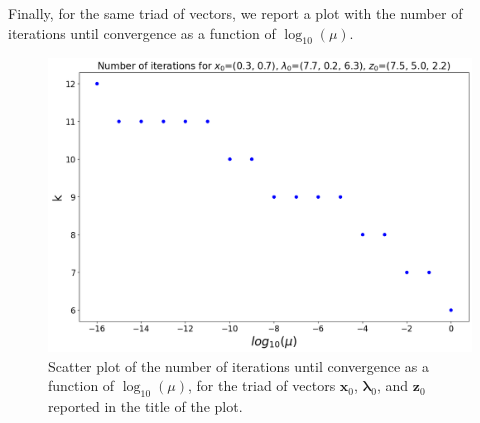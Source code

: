 \documentclass[a4paper,11pt]{article}
\begin{document}
\noindent Finally, for the same triad of vectors, we report a plot with the number of iterations until convergence as a function of $\log_{10}(\mu)$.
\begin{figure}[H]
	\centering
	\includegraphics[scale=0.35]{Plot/number_iter_method=basic_x0=[0.3 0.7]_seed=10.png}
	\caption{Scatter plot of the number of iterations until convergence as a function of $\log_{10}(\mu)$, for the triad of vectors $\textbf{x}_{0}$, $\boldsymbol{\lambda}_{0}$, and $\textbf{z}_{0}$ reported in the title of the plot.}
	\label{Fig:func_a_number_iter}
\end{figure}
%
%
%
\end{document}
